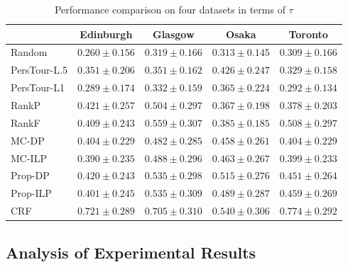 \begin{table*}
\centering
\caption{Performance comparison on four datasets in terms of $\tau$}
\begin{tabular}{l|cccc} \hline
 & Edinburgh & Glasgow & Osaka & Toronto \\ \hline
Random & $0.260\pm0.156$ & $0.319\pm0.166$ & $0.313\pm0.145$ & $0.309\pm0.166$ \\
PersTour-L.5 & $0.351\pm0.206$ & $0.351\pm0.162$ & $0.426\pm0.247$ & $0.329\pm0.158$ \\
PersTour-L1 & $0.289\pm0.174$ & $0.332\pm0.159$ & $0.365\pm0.224$ & $0.292\pm0.134$ \\
RankP & $0.421\pm0.257$ & $0.504\pm0.297$ & $0.367\pm0.198$ & $0.378\pm0.203$ \\
RankF & $0.409\pm0.243$ & $0.559\pm0.307$ & $0.385\pm0.185$ & $0.508\pm0.297$ \\
MC-DP & $0.404\pm0.229$ & $0.482\pm0.285$ & $0.458\pm0.261$ & $0.404\pm0.229$ \\
MC-ILP & $0.390\pm0.235$ & $0.488\pm0.296$ & $0.463\pm0.267$ & $0.399\pm0.233$ \\
Prop-DP & $0.420\pm0.243$ & $0.535\pm0.298$ & $0.515\pm0.276$ & $0.451\pm0.264$ \\
Prop-ILP & $0.401\pm0.245$ & $0.535\pm0.309$ & $0.489\pm0.287$ & $0.459\pm0.269$ \\
CRF & $\mathbf{0.721\pm0.289}$ & $\mathbf{0.705\pm0.310}$ & $\mathbf{0.540\pm0.306}$ & $\mathbf{0.774\pm0.292}$ \\
\hline
\end{tabular}
\end{table*}


\subsection{Analysis of Experimental Results}
\label{experiment:analysis}
